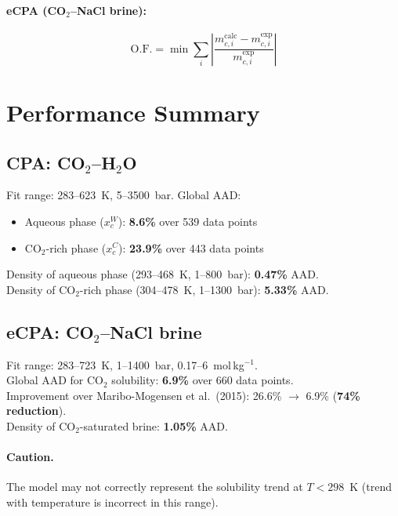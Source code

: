 \documentclass[11pt]{article}
\begin{document}
\paragraph{eCPA (CO$_2$--NaCl brine):}
\begin{equation}
  \text{O.F.} = \min \sum_i \left|\frac{m_{c,i}^{\text{calc}} - m_{c,i}^{\text{exp}}}{m_{c,i}^{\text{exp}}}\right|
\end{equation}

\section{Performance Summary}

\subsection{CPA: CO$_2$--H$_2$O}
Fit range: 283--623~K, 5--3500~bar. Global AAD:
\begin{itemize}
  \item Aqueous phase ($x_c^W$): \textbf{8.6\%} over 539 data points
  \item CO$_2$-rich phase ($x_c^C$): \textbf{23.9\%} over 443 data points
\end{itemize}
Density of aqueous phase (293--468~K, 1--800~bar): \textbf{0.47\%} AAD. \\
Density of CO$_2$-rich phase (304--478~K, 1--1300~bar): \textbf{5.33\%} AAD.

\subsection{eCPA: CO$_2$--NaCl brine}
Fit range: 283--723~K, 1--1400~bar, 0.17--6~mol\,kg$^{-1}$. \\
Global AAD for CO$_2$ solubility: \textbf{6.9\%} over 660 data points.\\
Improvement over Maribo-Mogensen et al.\ (2015): 26.6\% $\to$ 6.9\% (\textbf{74\% reduction}).\\
Density of CO$_2$-saturated brine: \textbf{1.05\%} AAD.

\paragraph{Caution.} The model may not correctly represent the solubility trend at $T < 298$~K
(trend with temperature is incorrect in this range).

\end{document}
